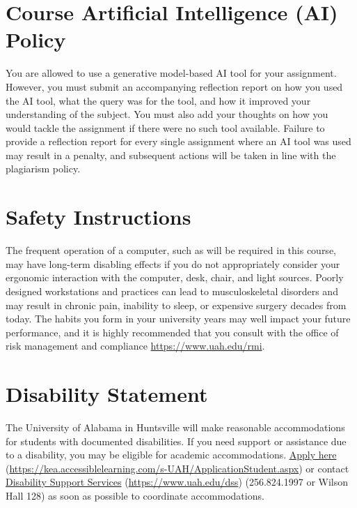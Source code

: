 \documentclass[11pt,oneside,openany]{book}
\begin{document}
\chapter{Course Artificial Intelligence (AI) Policy}
You are allowed to use a generative model-based AI tool for your assignment. However, you must submit an accompanying reflection report on how you used the AI tool, what the query was for the tool, and how it improved your understanding of the subject. You must also add your thoughts on how you would tackle the assignment if there were no such tool available. Failure to provide a reflection report for every single assignment where an AI tool was used may result in a penalty, and subsequent actions will be taken in line with the plagiarism policy.

\chapter{Safety Instructions}
The frequent operation of a computer, such as will be required in this course, may have long-term disabling effects if you do not appropriately consider your ergonomic interaction with the computer, desk, chair, and light sources. Poorly designed workstations and practices can lead to musculoskeletal disorders and may result in chronic pain, inability to sleep, or expensive surgery decades from today. The habits you form in your university years may well impact your future performance, and it is highly recommended that you consult with the office of risk management and compliance \href{https://www.uah.edu/rmi}{https://www.uah.edu/rmi}.

\chapter{Disability Statement}
The University of Alabama in Huntsville will make reasonable accommodations for students with documented disabilities. If you need support or assistance due to a disability, you may be eligible for academic accommodations. \href{https://kea.accessiblelearning.com/s-UAH/ApplicationStudent.aspx}{Apply here} (\url{https://kea.accessiblelearning.com/s-UAH/ApplicationStudent.aspx}) or contact \href{https://www.uah.edu/dss}{Disability Support Services} (\url{https://www.uah.edu/dss}) (256.824.1997 or Wilson Hall 128) as soon as possible to coordinate accommodations.
\end{document}
